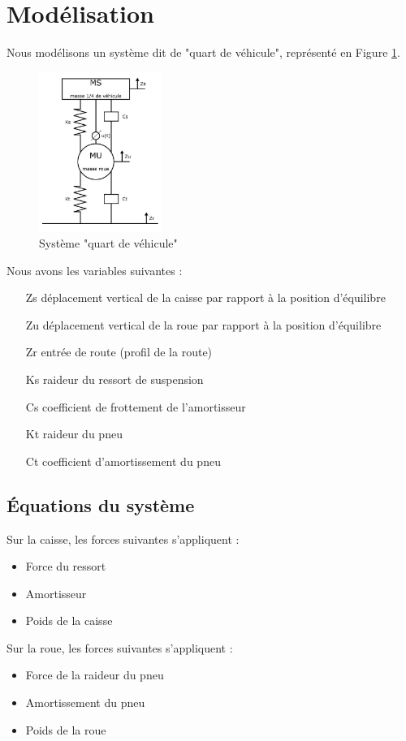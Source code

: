 \documentclass[a4paper,12pt]{insa} %
\begin{document}
\section{Modélisation}
Nous modélisons un système dit de "quart de véhicule", représenté en Figure  \ref{Système "quart de véhicule"}. \\
\begin{center}
    \begin{figure}[H]
        \centering
        \includegraphics[width=4cm, keepaspectratio]{figures/Quart_vehicule.png}
        \caption{Système "quart de véhicule"}
        \label{Système "quart de véhicule"}
    \end{figure}
\end{center}
Nous avons les variables suivantes : \\
\begin{itemize}
\item[Zs] déplacement vertical de la caisse par rapport à la position d’équilibre
\item[Zu] déplacement vertical de la roue par rapport à la position d’équilibre
\item[Zr] entrée de route (profil de la route)
\item[Ks] raideur du ressort de suspension
\item[Cs] coefficient de frottement de l’amortisseur 
\item[Kt] raideur du pneu
\item[Ct] coefficient d’amortissement du pneu
\end{itemize}

\subsection{Équations du système}
Sur la caisse, les forces suivantes s'appliquent : \\
\begin{itemize}
\item Force du ressort
\item Amortisseur
\item Poids de la caisse
\end{itemize}
Sur la roue, les forces suivantes s'appliquent : \\
\begin{itemize}
\item Force de la raideur du pneu
\item Amortissement du pneu
\item Poids de la roue
\end{itemize}
\end{document}
